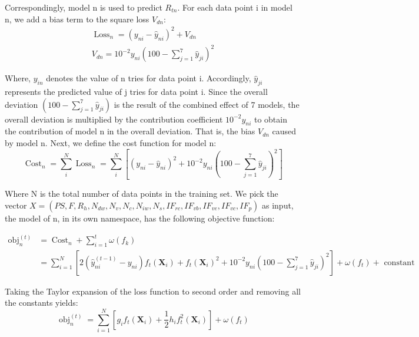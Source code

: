 \documentclass[a4paper]{jpconf}
\begin{document}
Correspondingly, model n is used to predict $R_{tn}$. For each data point i in model n, we add a bias term to the square loss $V_{dn}$:
\begin{equation}
\begin{array}{c}
\operatorname{Loss}_{n}=\left(y_{n i}-\hat{y}_{n i}\right)^{2}+V_{d n} \\
V_{d n}=10^{-2} y_{n i}\left(100-\sum_{j=1}^{7} \hat{y}_{j i}\right)^{2}
\end{array}
\end{equation}

Where, $y_{in}$ denotes the value of n tries for data point i. Accordingly, $\hat{y}_{ji}$ represents the predicted value of j tries for data point i. Since the overall deviation $(100-\sum_{j=1}^{7} \hat{y}_{j i})$ is the result of the combined effect of 7 models, the overall deviation is multiplied by the contribution coefficient $10^{-2}y_{ni}$ to obtain the contribution of model n in the overall deviation. That is, the bias $V_{dn}$ caused by model n.
Next, we define the cost function for model n:
\begin{equation}
\operatorname{Cost}_{n}=\sum_{i}^{N} \operatorname{Loss}_{n}=\sum_{i}^{N}\left[\left(y_{n i}-\hat{y}_{n i}\right)^{2}+10^{-2} y_{n i}\left(100-\sum_{j=1}^{7} \hat{y}_{j i}\right)^{2}\right]
\end{equation}


Where N is the total number of data points in the training set.
We pick the vector $X=\left(P S, F, R_{h}, N_{d w}, N_{v}, N_{c}, N_{i w}, N_{s}, I F_{r c}, I F_{v b}, I F_{v e}, I F_{v c}, I F_{p}\right)$ as input, the model of n, in its own namespace, has the following objective function:

\begin{equation}
\begin{split}
    \mathrm{obj}_{n}^{(t)} & =\operatorname{Cost}_{n}+\sum_{i=1}^{t} \omega\left(f_{k}\right) \\
& =\sum_{i=1}^{N}\left[2\left(\hat{y}_{n i}^{(t-1)}-y_{n i}\right) f_{t}\left(\boldsymbol{X}_{i}\right)+f_{t}\left(\boldsymbol{X}_{i}\right)^{2}+10^{-2} y_{n i}\left(100-\sum_{j=1}^{7} \hat{y}_{j i}\right)^{2}\right]+\omega\left(f_{t}\right)+\text { constant }
\end{split}
\end{equation}

Taking the Taylor expansion of the loss function to second order and removing all the constants yields:
\begin{equation}
\operatorname{obj}_{n}^{(t)}{ }= \sum_{i=1}^{N}\left[g_{i} f_{t}\left(\boldsymbol{X}_{i}\right)+\frac{1}{2} h_{i} f_{t}^{2}\left(\boldsymbol{X}_{i}\right)\right]+\omega\left(f_{t}\right)
\end{equation}
\end{document}
